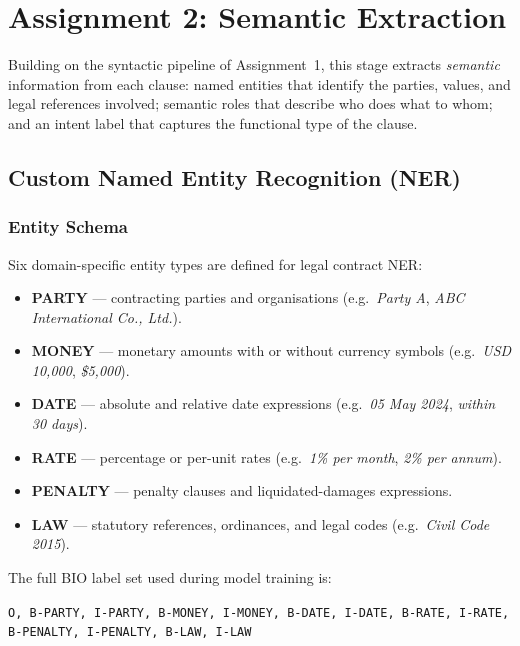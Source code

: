 \documentclass[assignment.tex]{subfiles}
\begin{document}
\chapter{Assignment 2: Semantic Extraction}
\label{sec:assignment2}

Building on the syntactic pipeline of Assignment~1, this stage extracts
\emph{semantic} information from each clause: named entities that identify the
parties, values, and legal references involved; semantic roles that describe who
does what to whom; and an intent label that captures the functional type of the
clause.

\section{Custom Named Entity Recognition (NER)}
\label{subsec:ner}

\subsection{Entity Schema}

Six domain-specific entity types are defined for legal contract NER:

\begin{itemize}[leftmargin=*, itemsep=3pt]
    \item \textbf{PARTY} — contracting parties and organisations
          (e.g.\ \textit{Party A}, \textit{ABC International Co., Ltd.}).
    \item \textbf{MONEY} — monetary amounts with or without currency symbols
          (e.g.\ \textit{USD 10,000}, \textit{\$5,000}).
    \item \textbf{DATE} — absolute and relative date expressions
          (e.g.\ \textit{05 May 2024}, \textit{within 30 days}).
    \item \textbf{RATE} — percentage or per-unit rates
          (e.g.\ \textit{1\% per month}, \textit{2\% per annum}).
    \item \textbf{PENALTY} — penalty clauses and liquidated-damages expressions.
    \item \textbf{LAW} — statutory references, ordinances, and legal codes
          (e.g.\ \textit{Civil Code 2015}).
\end{itemize}

The full BIO label set used during model training is:
\begin{center}
    \texttt{O, B-PARTY, I-PARTY, B-MONEY, I-MONEY, B-DATE, I-DATE,
    B-RATE, I-RATE, B-PENALTY, I-PENALTY, B-LAW, I-LAW}
\end{center}
\end{document}
